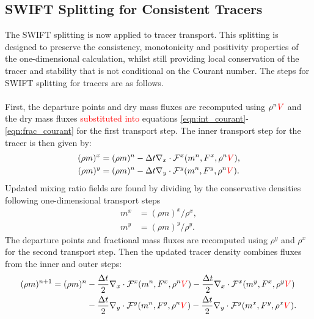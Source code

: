 \documentclass{ametsocV6.1}
\newcommand{\change}[1]{\textcolor{red}{#1}}
\begin{document}
\subsection{SWIFT Splitting for Consistent Tracers} \label{sec:swift_tracer}
The SWIFT splitting is now applied to tracer transport.
This splitting is designed to preserve the consistency, monotonicity and positivity properties of the one-dimensional calculation, whilst still providing local conservation of the tracer and stability that is not conditional on the Courant number.
The steps for SWIFT splitting for tracers are as follows. \\
\\
First, the departure points and dry mass fluxes are recomputed using $\rho^n\change{V}$ and the dry mass fluxes \change{substituted into} equations \eqref{eqn:int_courant}-\eqref{eqn:frac_courant} for the first transport step.
The inner transport step for the tracer is then given by:
\begin{subequations}
\begin{align}  \label{eqn:swift_split_1}   
        (\rho m)^x &= (\rho m)^n - \Delta{t} \nabla_x\cdot \mathcal{F}^x(m^n,F^{x},\rho^n\change{V}), \\ \label{eqn:swift_split_2}
        (\rho m)^y &= (\rho m)^n - \Delta{t} \nabla_y\cdot \mathcal{F}^y(m^n,F^{y},\rho^n\change{V}).
\end{align}
\end{subequations}
Updated mixing ratio fields are found by dividing by the conservative densities following one-dimensional transport steps
\begin{subequations}
\begin{align}
m^x &= (\rho m)^x / \rho^x, \\
m^y &= (\rho m)^y / \rho^y.
\end{align}
\end{subequations}
The departure points and fractional mass fluxes are recomputed using $\rho^y$ and $\rho^x$ for the second transport step.
Then the updated tracer density combines fluxes from the inner and outer steps:
\begin{equation} \label{eqn:swift_tracer}
\begin{split}
(\rho m)^{n+1} = (\rho m)^n & -\frac{\Delta{t}}{2}\nabla_x\cdot \mathcal{F}^x(m^n,F^{x},\rho^n\change{V}) -\frac{\Delta{t}}{2}\nabla_x\cdot \mathcal{F}^x(m^y,F^{x},\rho^y\change{V}) \\
        & - \frac{\Delta{t}}{2}\nabla_y\cdot \mathcal{F}^y(m^n,F^{y},\rho^n\change{V}) -\frac{\Delta{t}}{2}\nabla_y\cdot \mathcal{F}^y(m^x,F^{y},\rho^x\change{V}).
\end{split}
\end{equation}
\end{document}
